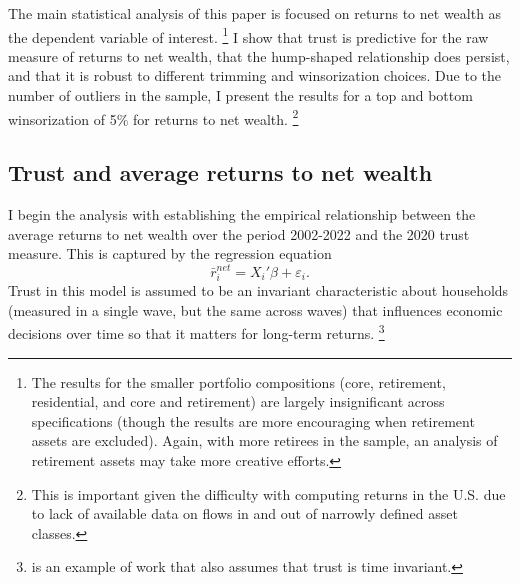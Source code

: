 \par The main statistical analysis of this paper is focused on returns to net wealth as the dependent variable of interest. \footnote{The results for the smaller portfolio compositions (core, retirement, residential, and core and retirement) are largely insignificant across specifications (though the results are more encouraging when retirement assets are excluded). Again, with more retirees in the sample, an analysis of retirement assets may take more creative efforts.} I show that trust is predictive for the raw measure of returns to net wealth, that the hump-shaped relationship does persist, and that it is robust to different trimming and winsorization choices. Due to the number of outliers in the sample, I present the results for a top and bottom winsorization of 5\% for returns to net wealth. \footnote{This is important given the difficulty with computing returns in the U.S. due to lack of available data on flows in and out of narrowly defined asset classes.}

\subsection{Trust and average returns to net wealth}

\par I begin the analysis with establishing the empirical relationship between the average returns to net wealth over the period 2002-2022 and the 2020 trust measure. This is captured by the regression equation \[\bar{r}^{net}_{i} = X_{i}'\beta + \varepsilon_{i}.\] Trust in this model is assumed to be an invariant characteristic about households (measured in a single wave, but the same across waves) that influences economic decisions over time so that it matters for long-term returns. \footnote{\cite{Lesmeister2019} is an example of work that also assumes that trust is time invariant.}

\FloatBarrier

